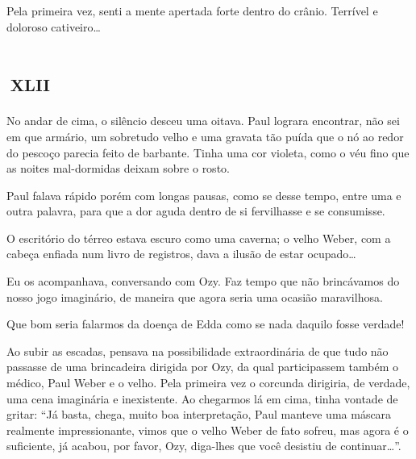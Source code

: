 Pela primeira vez, senti a mente apertada forte dentro do crânio. Terrível e doloroso cativeiro\ldots{}


\chapter*{\small{}\,\Large\centering\textsc{xlii}\,\small{}}


No andar de cima, o silêncio desceu uma oitava. Paul lograra encontrar, não sei em que armário, um sobretudo velho e uma gravata tão puída que o nó ao redor do pescoço parecia feito de barbante. Tinha uma cor violeta, como o véu fino que as noites mal-dormidas deixam sobre o rosto.


Paul falava rápido porém com longas pausas, como se desse tempo, entre uma e outra palavra, para que a dor aguda dentro de si fervilhasse e se consumisse.

O escritório do térreo estava escuro como uma caverna; o velho Weber, com a cabeça enfiada num livro de registros, dava a ilusão de estar ocupado\ldots{}


Eu os acompanhava, conversando com Ozy. Faz tempo que não brincávamos do nosso jogo imaginário, de maneira que agora seria uma ocasião maravilhosa.

Que bom seria falarmos da doença de Edda como se nada daquilo fosse verdade!

Ao subir as escadas, pensava na possibilidade extraordinária de que tudo não passasse de uma brincadeira dirigida por Ozy, da qual participassem também o médico, Paul Weber e o velho. Pela primeira vez o corcunda dirigiria, de verdade, uma cena imaginária e inexistente. Ao chegarmos lá em cima, tinha vontade de gritar: ``Já basta, chega, muito boa interpretação, Paul manteve uma máscara realmente impressionante, vimos que o velho Weber de fato sofreu, mas agora é o suficiente, já acabou, por favor, Ozy, diga-lhes que você desistiu de continuar\ldots{}''.

